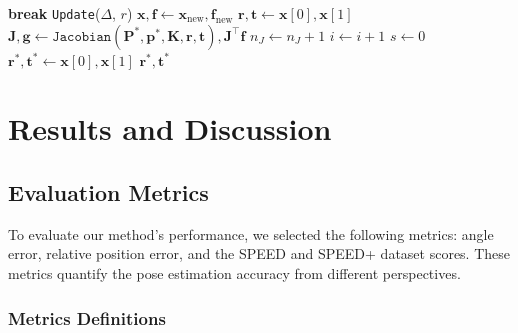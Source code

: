 \documentclass[a4paper,fleqn]{cas-sc}
\begin{document}
\begin{algorithm}
\begin{algorithmic}[1]
		\STATE \textbf{break}
		\ENDIF
		\STATE \texttt{Update}($\Delta$, $r$)
		\ENDWHILE
		\STATE $\mathbf{x}, \mathbf{f} \gets \mathbf{x}_{\text{new}}, \mathbf{f}_{\text{new}}$
		\STATE $\mathbf{r}, \mathbf{t} \gets \mathbf{x}[0], \mathbf{x}[1]$
		\STATE $\mathbf{J}, \mathbf{g} \gets \texttt{Jacobian}(\mathbf{P}^*, \mathbf{p}^*, \mathbf{K}, \mathbf{r}, \mathbf{t}), \mathbf{J}^\top \mathbf{f}$
		\STATE $n_J \gets n_J + 1$
		\ENDIF
		\STATE $i \gets i + 1$
		\ENDWHILE
		\STATE $s \gets 0$
		\ENDIF
		\STATE $\mathbf{r}^*, \mathbf{t}^* \gets \mathbf{x}[0], \mathbf{x}[1]$
		\RETURN $\mathbf{r}^*, \mathbf{t}^*$
	\end{algorithmic}
\end{algorithm}


\section{Results and Discussion} \label{sec:experiments}

\subsection{Evaluation Metrics}

To evaluate our method’s performance, we selected the following metrics: angle error, relative position error, and the SPEED and SPEED+ dataset scores. These metrics quantify the pose estimation accuracy from different perspectives.

\subsubsection{Metrics Definitions}
\end{document}
